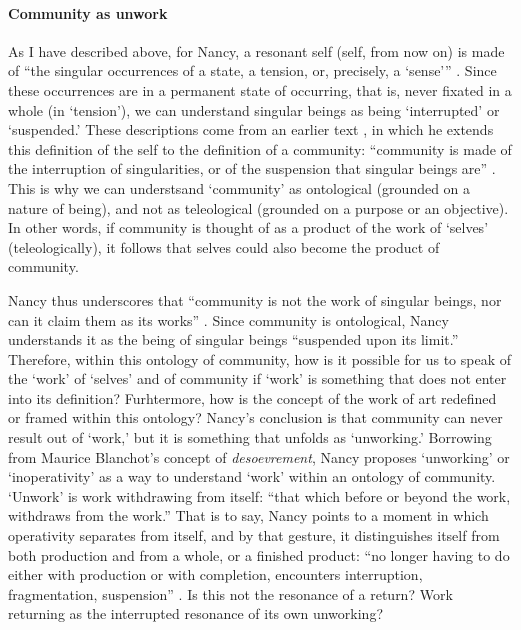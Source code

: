 \paragraph{Community as unwork}
As I have described above, for Nancy, a resonant self (self, from now on) is made of ``the singular occurrences of a state, a tension, or, precisely, a `sense''' \parencite[8]{Nan07:Lis}. Since these occurrences are in a permanent state of occurring, that is, never fixated in a whole (in `tension'), we can understand singular beings as being `interrupted' or `suspended.' These descriptions come from an earlier text \textcite{Nan91:The}, in which he extends this definition of the self to the definition of a community: ``community is made of the interruption of singularities, or of the suspension that singular beings are'' \parencite[31][All subsequent quotes from this passage.]{Nan91:The}. This is why we can understsand `community' as ontological (grounded on a nature of being), and not as teleological (grounded on a purpose or an objective). In other words, if community is thought of as a product of the work of `selves' (teleologically), it follows that selves could also become the product of community. 


Nancy thus underscores that ``community is not the work of singular beings, nor can it claim them as its works'' . Since community is ontological, Nancy understands it as the being of singular beings ``suspended upon its limit.'' Therefore, within this ontology of community, how is it possible for us to speak of the `work' of `selves' and of community if `work' is something that does not enter into its definition? Furhtermore, how is the concept of the work of art redefined or framed within this ontology? Nancy's conclusion is that community can never result out of `work,' but it is something that unfolds as `unworking.' Borrowing from Maurice Blanchot's concept of \textit{desoevrement}, Nancy proposes `unworking' or `inoperativity' as a way to understand `work' within an ontology of community. `Unwork' is work withdrawing from itself: ``that which before or beyond the work, withdraws from the work.'' That is to say, Nancy points to a moment in which operativity separates from itself, and by that gesture, it distinguishes itself from both production and from a whole, or a finished product: ``no longer having to do either with production or with completion, encounters interruption, fragmentation, suspension'' . Is this not the resonance of a return? Work returning as the interrupted resonance of its own unworking?

